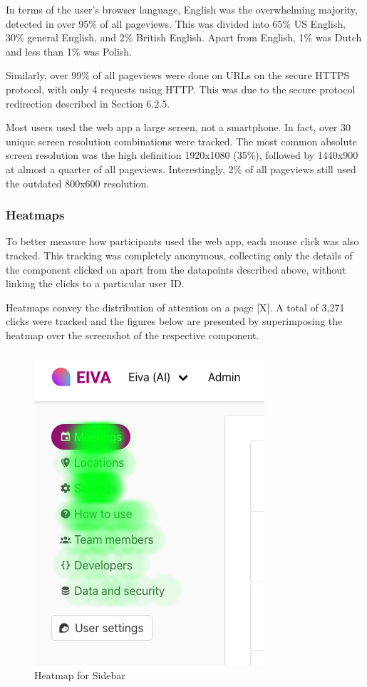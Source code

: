 \documentclass{article}
\begin{document}
In terms of the user's browser language, English was the overwhelming majority, detected in over 95\% of all pageviews. This was divided into 65\% US English, 30\% general English, and 2\% British English. Apart from English, 1\% was Dutch and less than 1\% was Polish.

Similarly, over 99\% of all pageviews were done on URLs on the secure HTTPS protocol, with only 4 requests using HTTP. This was due to the secure protocol redirection described in Section 6.2.5.

Most users used the web app a large screen, not a smartphone. In fact, over 30 unique screen resolution combinations were tracked. The most common absolute screen resolution was the high definition 1920x1080 (35\%), followed by 1440x900 at almost a quarter of all pageviews. Interestingly, 2\% of all pageviews still used the outdated 800x600 resolution.

\subsubsection{Heatmaps}

To better measure how participants used the web app, each mouse click was also tracked. This tracking was completely anonymous, collecting only the details of the component clicked on apart from the datapoints described above, without linking the clicks to a particular user ID.

Heatmaps convey the distribution of attention on a page [X]. A total of 3,271 clicks were tracked and the figures below are presented by superimposing the heatmap over the screenshot of the respective component.

\begin{figure}\centering
	\includegraphics[scale=0.5]{heatmap-sidebar.png}
	\caption{Heatmap for Sidebar}
\end{figure}
\end{document}
